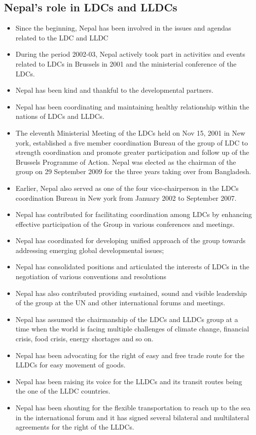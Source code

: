\documentclass[
  openany]{book}
\providecommand{\tightlist}{%
  \setlength{\itemsep}{0pt}\setlength{\parskip}{0pt}}
\begin{document}
\hypertarget{nepals-role-in-ldcs-and-lldcs}{%
\subsection{Nepal's role in LDCs and LLDCs}\label{nepals-role-in-ldcs-and-lldcs}}

\begin{itemize}
\tightlist
\item
  Since the beginning, Nepal has been involved in the issues and agendas related to the LDC and LLDC
\item
  During the period 2002-03, Nepal actively took part in activities and events related to LDCs in Brussels in 2001 and the ministerial conference of the LDCs.
\item
  Nepal has been kind and thankful to the developmental partners.
\item
  Nepal has been coordinating and maintaining healthy relationship within the nations of LDCs and LLDCs.
\item
  The eleventh Ministerial Meeting of the LDCs held on Nov 15, 2001 in New york, established a five member coordination Bureau of the group of LDC to strength coordination and promote greater participation and follow up of the Brussels Programme of Action. Nepal was elected as the chairman of the group on 29 September 2009 for the three years taking over from Bangladesh.
\item
  Earlier, Nepal also served as one of the four vice-chairperson in the LDCs coordination Bureau in New york from January 2002 to September 2007.
\item
  Nepal has contributed for facilitating coordination among LDCs by enhancing effective participation of the Group in various conferences and meetings.
\item
  Nepal has coordinated for developing unified approach of the group towards addressing emerging global developmental issues;
\item
  Nepal has consolidated positions and articulated the interests of LDCs in the negotiation of various conventions and resolutions
\item
  Nepal has also contributed providing sustained, sound and visible leadership of the group at the UN and other international forums and meetings.
\item
  Nepal has assumed the chairmanship of the LDCs and LLDCs group at a time when the world is facing multiple challenges of climate change, financial crisis, food crisis, energy shortages and so on.
\item
  Nepal has been advocating for the right of easy and free trade route for the LLDCs for easy movement of goods.
\item
  Nepal has been raising its voice for the LLDCs and its transit routes being the one of the LLDC countries.
\item
  Nepal has been shouting for the flexible transportation to reach up to the sea in the international forum and it has signed several bilateral and multilateral agreements for the right of the LLDCs.
\end{itemize}
\end{document}
